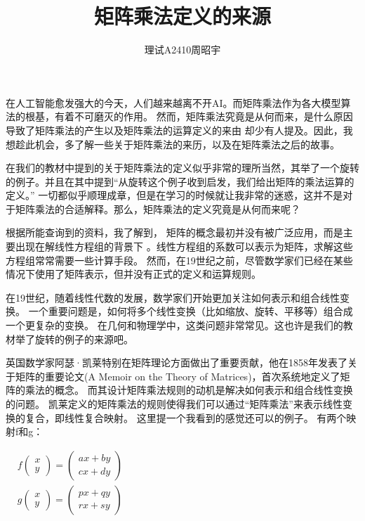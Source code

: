 \documentclass[12pt,a4paper]{article}%
\title{\fontsize{18pt}{27pt}\selectfont%
	{\heiti
		矩阵乘法定义的来源}}%
\author{\fontsize{12pt}{18pt}\selectfont%
{\fontsize{10.5pt}{15.75pt}\selectfont%
{\fangsong%
理试A2410周昭宇}}}%
\date{}%
\begin{document}
\maketitle

在人工智能愈发强大的今天，人们越来越离不开AI。而矩阵乘法作为各大模型算法的根基，有着不可磨灭的作用。
然而，矩阵乘法究竟是从何而来，是什么原因导致了矩阵乘法的产生以及矩阵乘法的运算定义的来由
却少有人提及。因此，我想趁此机会，多了解一些关于矩阵乘法的来历，以及在矩阵乘法之后的故事。

在我们的教材中提到的关于矩阵乘法的定义似乎非常的理所当然，其举了一个旋转的例子。并且在其中提到“从旋转这个例子收到启发，我们给出矩阵的乘法运算的定义。”
一切都似乎顺理成章，但是在学习的时候就让我非常的迷惑，这并不是对于矩阵乘法的合适解释。那么，矩阵乘法的定义究竟是从何而来呢？

根据所能查询到的资料，我了解到，
矩阵的概念最初并没有被广泛应用，而是主要出现在解线性方程组的背景下
。线性方程组的系数可以表示为矩阵，求解这些方程组常常需要一些计算手段。
然而，在19世纪之前，尽管数学家们已经在某些情况下使用了矩阵表示，但并没有正式的定义和运算规则。

在19世纪，随着线性代数的发展，数学家们开始更加关注如何表示和组合线性变换。
一个重要问题是，如何将多个线性变换（比如缩放、旋转、平移等）组合成一个更复杂的变换。
在几何和物理学中，这类问题非常常见。这也许是我们的教材举了旋转的例子的来源吧。

英国数学家阿瑟·凯莱特别在矩阵理论方面做出了重要贡献，他在1858年发表了关于矩阵的重要论文(A Memoir on the Theory of Matrices)，首次系统地定义了矩阵的乘法的概念。
而其设计矩阵乘法规则的动机是解决如何表示和组合线性变换的问题。
凯莱定义的矩阵乘法的规则使得我们可以通过“矩阵乘法”来表示线性变换的复合，即线性复合映射。
这里提一个我看到的感觉还可以的例子。
有两个映射f和g：
\begin{center}
$
\begin{aligned}
&f\begin{pmatrix}
    x \\
    y
\end{pmatrix}=\begin{pmatrix}
    ax + by \\
    cx + dy
\end{pmatrix}\\
&g\begin{pmatrix}
    x \\
    y
\end{pmatrix}=\begin{pmatrix}
    px + qy \\
    rx + sy
\end{pmatrix}
\end{aligned}
$
\end{center}
\end{document}
